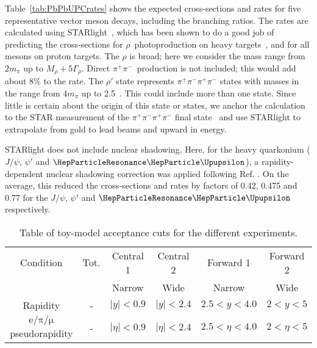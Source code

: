\documentclass[../report.tex]{subfiles}
\begin{document}
Table~\ref{tab:PbPbUPCrates} shows the expected cross-sections and rates for five representative vector meson decays, including the branching ratios.  The rates are calculated using STARlight~\cite{Klein:2016yzr}, which has been shown to do a good job of predicting the cross-sections for $\rho$~photoproduction on heavy targets~\cite{Adam:2015gsa,Abelev:2007nb}, and for all mesons on proton targets.  The $\rho$ is broad; here we consider the mass range from $2m_\pi$ up to $M_\rho + 5\Gamma_\rho$.  Direct $\pi^+\pi^-$~production is not included; this would add about 8\% to the rate.  
The $\rho'$ state represents $\pi^+\pi^-\pi^+\pi^-$ states with masses in the range from 4$m_{\pi}$ up to 2.5~\UGeVcc.  This could include more than one state.  Since little is certain about the origin of this state or states, we anchor the calculation to the STAR measurement of the $\pi^+\pi^-\pi^+\pi^-$ final state~\cite{Abelev:2009aa} and use STARlight to extrapolate from gold to lead beams and upward in energy. 

STARlight does not include nuclear shadowing.  Here, for the heavy quarkonium ($J/\psi$, $\psi'$ and $\PGUP{}$), a rapidity-dependent nuclear shadowing correction was applied following Ref. \cite{Guzey:2016piu}.  On the average, this reduced the cross-sections and rates  by factors of 0.42, 0.475 and 0.77 for the $J/\psi$, $\psi'$ and $\PGUP{}$ respectively.  

\begin{table}[h]
\caption{Table of toy-model acceptance cuts for the different experiments.}
\begin{tabular}{|c|ccccc|}
\hline
Condition & Tot. & Central 1 & Central 2 & Forward 1 &  Forward 2   \\
                 &       & Narrow  & Wide    &      Narrow     &    Wide         \\
\hline
Rapidity & - & $|y|<0.9$ & $|y|<2.4$ & $2.5 < y < 4.0$ &   $2 < y < 5$ \\
$\mathrm{e/\pi/\mu}$ pseudorapidity & - & $|\eta|<0.9$ & $|\eta|<2.4$  & $2.5 < \eta < 4.0$ & $2 < \eta <5 $ \\
\hline
\end{tabular}
\label{tab:UPCtoyacceptance}
\end{table}
\end{document}
